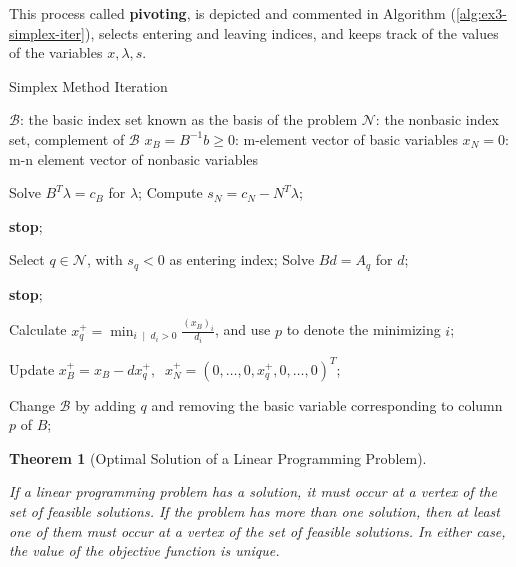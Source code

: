 \documentclass[unicode,11pt,a4paper,oneside,numbers=endperiod,openany]{scrartcl}
\newtheorem{theorem}{Theorem}[section]
\newcommand{\myth}[3]{
    \begin{theorem}[#1] 
        \label{#2} 
        #3 
    \end{theorem}
}
\begin{document}
This process called \textbf{pivoting}, 
is depicted and commented in Algorithm (\ref{alg:ex3-simplex-iter}), 
selects entering and leaving indices, and keeps track of the values of the variables 
\( x, \lambda, s \).


\begin{algorithm}
\caption{Simplex Method Iteration}\label{alg:ex3-simplex-iter}
  \begin{algorithmic}[1]
    \Require \( \mathcal{B}\): the basic index set known as the basis of the problem
    \Require \( \mathcal{N} \): the nonbasic index set, complement of \( \mathcal{B} \)
    \Require \( x_B = B^{-1} b \geq 0 \): m-element vector of basic variables
    \Require \( x_N = 0 \): m-n element vector of nonbasic variables

    \State Solve \( B^T \lambda = c_B \) for \( \lambda \);
    \State Compute \( s_N = c_N - N^T \lambda \); 
    \State

        \State \textbf{stop};  
    \EndIf
    \State

    \State Select \( q \in \mathcal{N} \), with \( s_q < 0 \) as entering index; 
    \State Solve \( Bd = A_q \) for \( d \);
    \State

        \State \textbf{stop};  
    \EndIf
    \State

    \State Calculate \( x_q^+ = \min_{i \; \mid \; d_i > 0} \frac{(x_B)_i}{d_i} \),
    and use \( p \) to denote the minimizing \( i \);

    \State Update \( x_B^+ = x_B - dx_q^+, \;\; x_N^+ = (0, \ldots, 0, x_q^+, 0, \ldots, 0)^T \);

    \State Change \( \mathcal{B} \) by adding \( q \) and removing the basic variable 
    corresponding to column \( p \) of \( B \);

  \end{algorithmic}
\end{algorithm}

\myth{Optimal Solution of a Linear Programming Problem}{th:linear-programming-solution}{
    If a linear programming problem has a solution,
    it must occur at a vertex of the set of feasible solutions.
    If the problem has more than one solution,
    then at least one of them must occur at a vertex of the set of feasible solutions.
    In either case, the value of the objective function is unique.
}
\end{document}
